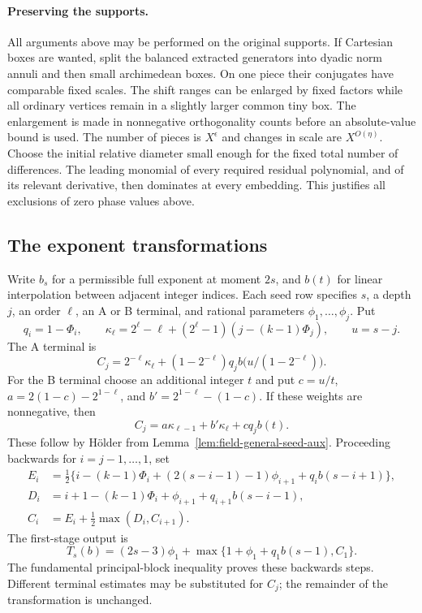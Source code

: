 \documentclass[11pt]{amsart}
\theoremstyle{definition}
\numberwithin{equation}{section}
\begin{document}
\paragraph{Preserving the supports.}
All arguments above may be performed on the original supports.  If
Cartesian boxes are wanted, split the balanced extracted generators into
dyadic norm annuli and then small archimedean boxes.  On one piece their
conjugates have comparable fixed scales.  The shift ranges can be enlarged
by fixed factors while all ordinary vertices remain in a slightly larger
common tiny box.  The enlargement is made in nonnegative orthogonality
counts before an absolute-value bound is used.  The number of pieces is
$X^\epsilon$ and changes in scale are $X^{O(\eta)}$.
Choose the initial relative diameter small enough for the fixed total
number of differences.  The leading monomial of every required residual
polynomial, and of its relevant derivative, then dominates at every
embedding.  This justifies all exclusions of zero phase values above.

\subsection{The exponent transformations}
Write $b_s$ for a permissible full exponent at moment $2s$, and
$b(t)$ for linear interpolation between adjacent integer indices.
Each seed row specifies $s$, a depth $j$, an order $\ell$, an A or B
terminal, and rational parameters $\phi_1,\ldots,\phi_j$. Put
\[
 q_i=1-\Phi_i,\qquad
 \kappa_\ell=2^\ell-\ell+(2^\ell-1)(j-(k-1)\Phi_j),
 \qquad u=s-j.
\]
The A terminal is
\begin{equation}\label{eq:seed-A-terminal}
 C_j=2^{-\ell}\kappa_\ell+
 (1-2^{-\ell})q_j b\bigl(u/(1-2^{-\ell})\bigr).
\end{equation}
For the B terminal choose an additional integer $t$ and put
$c=u/t$, $a=2(1-c)-2^{1-\ell}$, and
$b'=2^{1-\ell}-(1-c)$. If these weights are nonnegative, then
\begin{equation}\label{eq:seed-B-terminal}
 C_j=a\kappa_{\ell-1}+b'\kappa_\ell+cq_jb(t).
\end{equation}
These follow by H\"older from Lemma~\ref{lem:field-general-seed-aux}.
Proceeding backwards for $i=j-1,\ldots,1$, set
\begin{equation}\label{eq:seed-backwards}
 \begin{split}
 E_i&=\tfrac12\{i-(k-1)\Phi_i+(2(s-i-1)-1)\phi_{i+1}
                              +q_i b(s-i+1)\},\\
 D_i&=i+1-(k-1)\Phi_i+\phi_{i+1}+q_{i+1}b(s-i-1),\\
 C_i&=E_i+\tfrac12\max(D_i,C_{i+1}).
 \end{split}
\end{equation}
The first-stage output is
\begin{equation}\label{eq:seed-initial-output}
 T_s(b)=(2s-3)\phi_1+
       \max\{1+\phi_1+q_1b(s-1),C_1\}.
\end{equation}
The fundamental principal-block inequality proves these backwards
steps. Different terminal estimates may be substituted for $C_j$;
the remainder of the transformation is unchanged.
\end{document}
